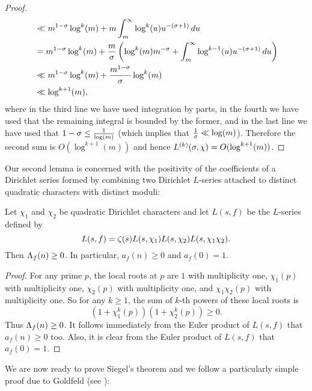 \begin{proof}
\begin{align*}
        &\ll m^{1-\sigma}\log^{k}(m)+m\int_{m}^{\infty}\log^{k}(u)u^{-(\sigma+1)}\,du \\
        &= m^{1-\sigma}\log^{k}(m)+\frac{m}{\sigma}\left(\log^{k}(m)m^{-\sigma}+\int_{m}^{\infty}\log^{k-1}(u)u^{-(\sigma+1)}\,du\right) \\
        &\ll m^{1-\sigma}\log^{k}(m)+\frac{m^{1-\sigma}}{\sigma}\log^{k}(m) \\
        &\ll \log^{k+1}(m),
      \end{align*}
      where in the third line we have used integration by parts, in the fourth we have used that the remaining integral is bounded by the former, and in the last line we have used that $1-\sigma \le \frac{1}{\log(m)}$ (which implies that $\frac{1}{\sigma} \ll \log(m)$). Therefore the second sum is $O(\log^{k+1}(m))$ and hence $L^{(k)}(\sigma,\chi) = O(\log^{k+1}(m))$.
    \end{proof}

    Our second lemma is concerned with the positivity of the coefficients of a Dirichlet series formed by combining two Dirichlet $L$-series attached to distinct quadratic characters with distinct moduli:

    \begin{lemma}\label{lem:Siegel_zero_auxiliary_L-function_lemma}
      Let $\chi_{1}$ and $\chi_{2}$ be quadratic Dirichlet characters and let $L(s,f)$ be the $L$-series defined by
      \[
        L(s,f) = \zeta(s)L(s,\chi_{1})L(s,\chi_{2})L(s,\chi_{1}\chi_{2}).
      \]
      Then $\Lambda_{f}(n) \ge 0$. In particular, $a_{f}(n) \ge 0$ and $a_{f}(0) = 1$.
    \end{lemma}
    \begin{proof}
      For any prime $p$, the local roots at $p$ are $1$ with multiplicity one, $\chi_{1}(p)$ with multiplicity one, $\chi_{2}(p)$ with multiplicity one, and $\chi_{1}\chi_{2}(p)$ with multiplicity one. So for any $k \ge 1$, the sum of $k$-th powers of these local roots is
      \[
        (1+\chi_{1}^{k}(p))(1+\chi_{2}^{k}(p)) \ge 0.
      \]
      Thus $\Lambda_{f}(n) \ge 0$. It follows immediately from the Euler product of $L(s,f)$ that $a_{f}(n) \ge 0$ too. Also, it is clear from the Euler product of $L(s,f)$ that $a_{f}(0) = 1$.
    \end{proof}

    We are now ready to prove Siegel's theorem and we follow a particularly simple proof due to Goldfeld (see \cite{goldfeld1974simple}):

